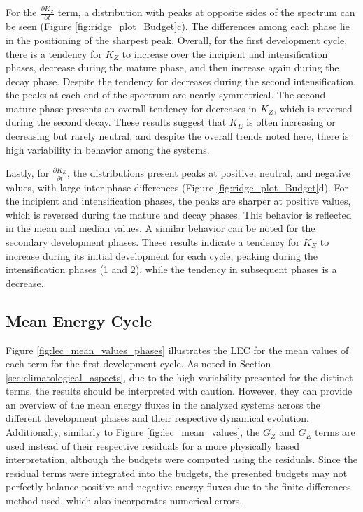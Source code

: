 For the $\frac{\partial K_Z}{\partial t}$ term, a distribution with peaks at opposite sides of the spectrum can be seen (Figure \ref{fig:ridge_plot_Budget}c). The differences among each phase lie in the positioning of the sharpest peak. Overall, for the first development cycle, there is a tendency for $K_Z$ to increase over the incipient and intensification phases, decrease during the mature phase, and then increase again during the decay phase. Despite the tendency for decreases during the second intensification, the peaks at each end of the spectrum are nearly symmetrical. The second mature phase presents an overall tendency for decreases in $K_Z$, which is reversed during the second decay. These results suggest that $K_E$ is often increasing or decreasing but rarely neutral, and despite the overall trends noted here, there is high variability in behavior among the systems.

Lastly, for $\frac{\partial K_E}{\partial t}$, the distributions present peaks at positive, neutral, and negative values, with large inter-phase differences (Figure \ref{fig:ridge_plot_Budget}d). For the incipient and intensification phases, the peaks are sharper at positive values, which is reversed during the mature and decay phases. This behavior is reflected in the mean and median values. A similar behavior can be noted for the secondary development phases. These results indicate a tendency for $K_E$ to increase during its initial development for each cycle, peaking during the intensification phases (1 and 2), while the tendency in subsequent phases is a decrease.

\subsection{Mean Energy Cycle}\label{sec:lec_mean_phases}

Figure \ref{fig:lec_mean_values_phases} illustrates the LEC for the mean values of each term for the first development cycle. As noted in Section \ref{sec:climatological_aspects}, due to the high variability presented for the distinct terms, the results should be interpreted with caution. However, they can provide an overview of the mean energy fluxes in the analyzed systems across the different development phases and their respective dynamical evolution. Additionally, similarly to Figure \ref{fig:lec_mean_values}, the $G_Z$ and $G_E$ terms are used instead of their respective residuals for a more physically based interpretation, although the budgets were computed using the residuals. Since the residual terms were integrated into the budgets, the presented budgets may not perfectly balance positive and negative energy fluxes due to the finite differences method used, which also incorporates numerical errors.

